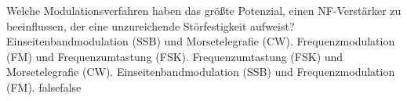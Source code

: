     {Welche Modulationsverfahren haben das größte Potenzial, einen NF-Verstärker zu beeinflussen, der eine unzureichende Störfestigkeit aufweist?}
    {Einseitenbandmodulation (SSB) und Morsetelegrafie (CW).}
    {Frequenzmodulation (FM) und Frequenzumtastung (FSK).}
    {Frequenzumtastung (FSK) und Morsetelegrafie (CW).}
    {Einseitenbandmodulation (SSB) und Frequenzmodulation (FM).}
    {false}{false}